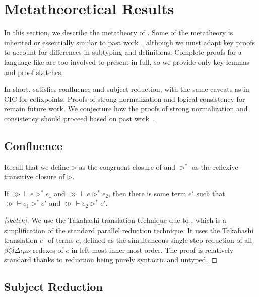 \section{Metatheoretical Results}
\label{sec:metatheory}

In this section, we describe the metatheory of \lang.
Some of the metatheory is inherited or essentially similar to past work~\citep{cic-hat-minus,cc-hat-omega,cic-hat},
although we must adapt key proofs to account for differences in subtyping and definitions.
Complete proofs for a language like \lang are too involved to present in full,
so we provide only key lemmas and proof sketches.

In short, \lang satisfies confluence and subject reduction, with the same caveats as in CIC for cofixpoints.
Proofs of strong normalization and logical consistency for \lang remain future work.
We conjecture how the proofs of strong normalization and consistency should proceed based on past work~\citep{cic-hat-minus,cc-hat-omega,cic-hat}.

\subsection{Confluence}

Recall that we define $\rhd$ as the congruent closure of \reduction and $\rhd^*$ as the reflexive--transitive closure of $\rhd$.

\begin{theorem}[Confluence]
\label{thm:metatheory:confluence}
  If $\gg \vdash e \rhd^* e_1$ and $\gg \vdash e \rhd^* e_2$,
  then there is some term $e'$ such that $\gg \vdash e_1 \rhd^* e'$ and $\gg \vdash e_2 \rhd^* e'$.
\end{theorem}

\begin{proof}[{[sketch]}]
  We use the Takahashi translation technique due to \citet{takahashitrans},
  which is a simplification of the standard parallel reduction technique.
  It uses the Takahashi translation $e^\dagger$ of terms $e$,
  defined as the simultaneous single-step reduction of all
  $\beta\zeta\delta\Delta\iota\mu\nu$-redexes of $e$ in left-most inner-most order.
  The proof is relatively standard thanks to reduction being purely syntactic and untyped.
\end{proof}

\subsection{Subject Reduction}
\label{sec:metatheory:sub-red}

